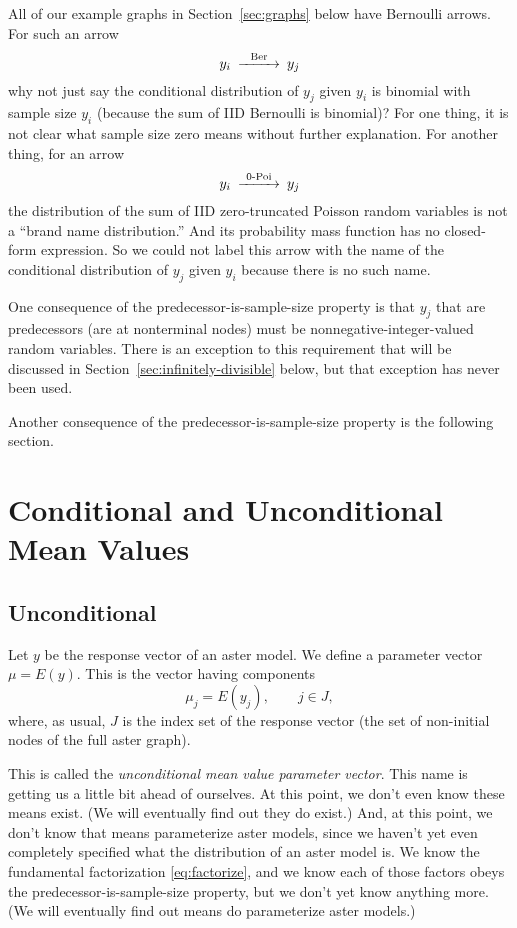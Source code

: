 All of our example graphs in Section~\ref{sec:graphs} below
have Bernoulli arrows.  For such an arrow
$$
\begin{CD}
   y_i @>\text{Ber}>> y_j
\end{CD}
$$
why not just say the conditional distribution of $y_j$ given $y_i$ is binomial
with sample size $y_i$ (because the sum of IID Bernoulli is binomial)?
For one thing,
it is not clear what sample size zero means without further explanation.
For another thing, for an arrow
$$
\begin{CD}
   y_i @>\text{0-Poi}>> y_j
\end{CD}
$$
the distribution of the sum of IID zero-truncated Poisson random variables
is not a ``brand name distribution.''  And its
probability mass function has no closed-form expression.
So we could not label this arrow with the name of the conditional distribution
of $y_j$ given $y_i$ because there is no such name.

One consequence of the predecessor-is-sample-size property is that $y_j$
that are predecessors (are at nonterminal nodes) must be
nonnegative-integer-valued random variables.
There is an exception to this requirement that will be discussed in
Section~\ref{sec:infinitely-divisible} below, but that exception has
never been used.

Another consequence of the predecessor-is-sample-size property is
the following section.

\section{Conditional and Unconditional Mean Values}

\subsection{Unconditional}

Let $y$ be the response vector of an aster model.  We define a parameter
vector $\mu = E(y)$.  This is the vector having components
$$
   \mu_j = E(y_j), \qquad j \in J,
$$
where, as usual, $J$ is the index set of the response vector (the set
of non-initial nodes of the full aster graph).

This is called the \emph{unconditional mean value parameter vector}.
This name is getting us a little bit ahead of ourselves.
At this point, we don't even know these means exist.
(We will eventually find out they do exist.)
And, at this point, we don't know that means parameterize aster models,
since we haven't yet even completely specified what the distribution
of an aster model is.  We know the fundamental factorization
\eqref{eq:factorize}, and we know each of those factors obeys the
predecessor-is-sample-size property, but we don't yet know anything more.
(We will eventually find out means do parameterize aster models.)

